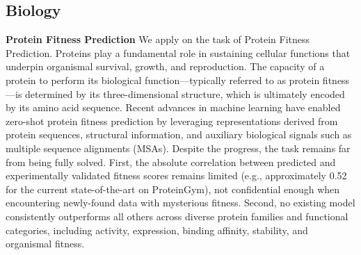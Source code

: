 
\subsection{Biology}


\textbf{Protein Fitness Prediction} We apply \method{} on the task of Protein Fitness Prediction. Proteins play a fundamental role in sustaining cellular functions that underpin organismal survival, growth, and reproduction. The capacity of a protein to perform its biological function—typically referred to as protein fitness—is determined by its three-dimensional structure, which is ultimately encoded by its amino acid sequence. Recent advances in machine learning have enabled zero-shot protein fitness prediction by leveraging representations derived from protein sequences, structural information, and auxiliary biological signals such as multiple sequence alignments (MSAs). Despite the progress, the task remains far from being fully solved. First, the absolute correlation between predicted and experimentally validated fitness scores remains limited (e.g., approximately 0.52 for the current state-of-the-art on ProteinGym), not confidential enough when encountering newly-found data with mysterious fitness. Second, no existing model consistently outperforms all others across diverse protein families and functional categories, including activity, expression, binding affinity, stability, and organismal fitness.




